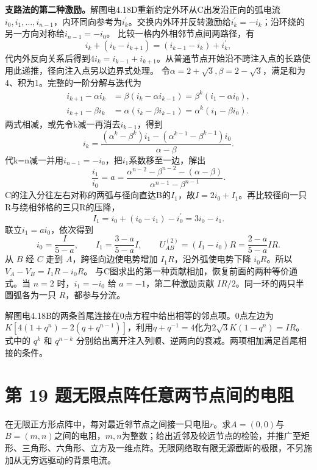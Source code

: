 \documentclass[UTF8,fontset=fandol,a4paper,11pt]{ctexart}
\begin{document}
\textbf{支路法的第二种激励。}解图电4.18D重新约定外环从C出发沿正向的弧电流$i_0,i_1,\ldots,i_{n-1}$，内环同向参考为$i_k^{\prime}$。交换内外环并反转激励给$i_k^{\prime}=-i_k$；沿环绕的另一方向对称给$i_{n-1}=-i_0$。
比较一格内外相邻节点间两路径，有
\[
i_k+(i_k-i_{k+1})=(i_{k-1}-i_k)+i_k^{\prime},
\]
代内外反向关系后得到$4i_k=i_{k-1}+i_{k+1}$。从普通节点开始沿不跨注入点的长路使用此递推，径向注入点另以边界式处理。
令$\alpha=2+\sqrt3,\beta=2-\sqrt3$，满足和为4、积为1。完整的一阶分解与迭代为
\begin{align*}
i_{k+1}-\alpha i_k&=\beta(i_k-\alpha i_{k-1})=\beta^k(i_1-\alpha i_0),\\
i_{k+1}-\beta i_k&=\alpha(i_k-\beta i_{k-1})=\alpha^k(i_1-\beta i_0).
\end{align*}
两式相减，或先令k减一再消去$i_{k-1}$，得到
\[
i_k=\frac{(\alpha^k-\beta^k)i_1-(\alpha^{k-1}-\beta^{k-1})i_0}{\alpha-\beta}.
\]
代k=n减一并用$i_{n-1}=-i_0$，把$i_1$系数移至一边，解出
\[
\frac{i_1}{i_0}=a=
\frac{\alpha^{n-2}-\beta^{n-2}-(\alpha-\beta)}{\alpha^{n-1}-\beta^{n-1}}.
\]
C的注入分往左右对称的两弧与径向直达B的$I_1$，故$I=2i_0+I_1$。再比较径向一只R与绕相邻格的三只R的压降，
\[
I_1=i_0+(i_0-i_1)-i_0^{\prime}=3i_0-i_1.
\]
联立$i_1=a i_0$，依次得到
\[
i_0=\frac{I}{5-a},\qquad I_1=\frac{3-a}{5-a}I,\qquad
U_{AB}^{(2)}=(I_1-i_0)R=\frac{2-a}{5-a}IR.
\]
从 $B$ 经 $C$ 走到 $A$，跨径向边使电势增加 $I_1R$，沿外弧使电势下降 $i_0R$。所以 $V_A-V_B=I_1R-i_0R$。
与C图求出的第一种贡献相加，恢复前面的两种等价通式。当 $n=2$ 时，$i_1=-i_0$ 给 $a=-1$，第二种激励贡献 $IR/2$。同一环的两只半圆弧各为一只 $R$，都参与分流。

解图电4.18B的两条首尾连接在0点方程中给出相等的邻点项。0点左边为$K[4(1+q^n)-2(q+q^{n-1})]$，利用$q+q^{-1}=4$化为$2\sqrt3K(1-q^n)=IR$。
式中的 $q^k$ 和 $q^{n-k}$ 分别给出离开注入列顺、逆两向的衰减。两项相加满足首尾相接的条件。




\section*{第 19 题\quad 无限点阵任意两节点间的电阻}\label{q:19}

在无限正方形点阵中，每对最近邻节点之间接一只电阻$r$。求$A=(0,0)$与$B=(m,n)$之间的电阻，$m,n$为整数；给出近邻及较远节点的检验，并推广至矩形、三角形、六角形、立方及一维点阵。无限网络取有限无源截断的极限，不另施加从无穷远驱动的背景电流。
\end{document}

